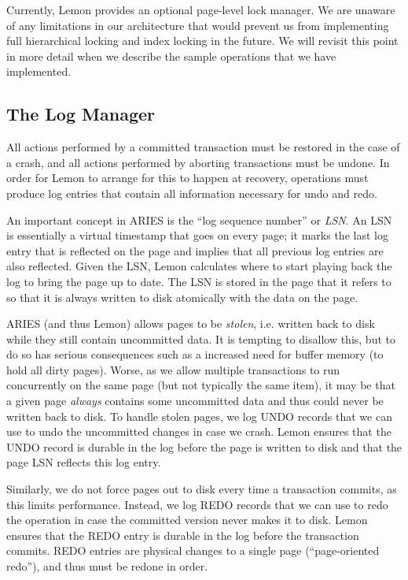 \documentclass[letterpaper,twocolumn,english]{article}
\newcommand{\yad}{Lemon\xspace}
\begin{document}
Currently, \yad provides an optional page-level lock manager.  We are
unaware of any limitations in our architecture that would prevent us
from implementing full hierarchical locking and index locking in the
future.  We will revisit this point in more detail when we describe
the sample operations that we have implemented.


\subsection{The Log Manager}

All actions performed by a committed transaction must be
restored in the case of a crash, and all actions performed by aborting
transactions must be undone. In order for \yad to arrange for this
to happen at recovery, operations must produce log entries that contain
all information necessary for undo and redo.

An important concept in ARIES is the ``log sequence number'' or {\em
LSN}.  An LSN is essentially a virtual timestamp that goes on every
page; it marks the last log entry that is reflected on the page and
implies that all previous log entries are also reflected.  Given the
LSN, \yad calculates where to start playing back the log to bring the
page up to date.  The LSN is stored in the page that it refers to so
that it is always written to disk atomically with the data on the
page.

ARIES (and thus \yad) allows pages to be {\em stolen}, i.e. written
back to disk while they still contain uncommitted data.  It is
tempting to disallow this, but to do so has serious consequences such as
a increased need for buffer memory (to hold all dirty pages). Worse,
as we allow multiple transactions to run concurrently on the same page
(but not typically the same item), it may be that a given page {\em
always} contains some uncommitted data and thus could never be written
back to disk.  To handle stolen pages, we log UNDO records that
we can use to undo the uncommitted changes in case we crash.  \yad
ensures that the UNDO record is durable in the log before the
page is written to disk and that the page LSN reflects this log entry.

Similarly, we do not force pages out to disk every time a transaction
commits, as this limits performance.  Instead, we log REDO records
that we can use to redo the operation in case the committed version never
makes it to disk.  \yad ensures that the REDO entry is durable in the
log before the transaction commits.  REDO entries are physical changes
to a single page (``page-oriented redo''), and thus must be redone in
order.
\end{document}

